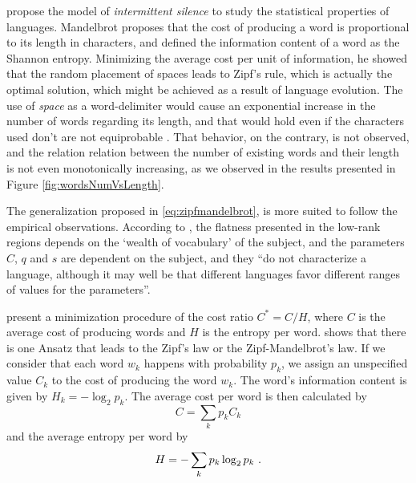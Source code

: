 \cite{miller1957,mandelbrot1965} propose the model of \textit{intermittent silence} to
study the statistical properties of languages. Mandelbrot proposes 
that the cost of producing a word is proportional to its length in characters,
and defined the information content of a word as the Shannon entropy.
Minimizing the average cost per unit of information, he showed that the
random placement of spaces leads to Zipf's rule, which is actually the optimal
solution, which might be achieved as a result of language evolution.
The use of \textit{space} as a word-delimiter 
would cause an exponential increase in the number of words regarding
its length, and that would hold even if the characters used don't
are not equiprobable \citep{li1992}. That behavior, on the contrary, is not
observed, and the relation relation between the number of existing words
and their length is not even monotonically increasing, as we observed 
in the results presented in Figure \ref{fig:wordsNumVsLength}.

The generalization proposed in \ref{eq:zipfmandelbrot}, is more suited to
follow the empirical observations. According to \cite{mandelbrot1965},
the flatness presented in the low-rank regions depends on the `wealth 
of vocabulary' of the subject, and the parameters $C$, $q$ and $s$
are dependent on the subject, and they ``do not characterize a language,
although it may well be that different languages favor different ranges
of values for the parameters''.

\cite{manin2009} present a minimization procedure of the cost ratio
$C^\ast = C/H$, where $C$ is the average cost of producing words 
and $H$ is the entropy per word. \cite{manin2009} shows that there is one
Ansatz that leads to the Zipf's law or the Zipf-Mandelbrot's law. 
If we consider that each word $w_k$ happens with probability $p_k$,
we assign an unspecified value $C_k$ to the cost of producing the word $w_k$.
The word's information content is given by $H_k = - \log_2 p_k$. 
The average cost per word is then calculated by
\begin{equation}
C = \sum_k p_k C_k
\end{equation}
and the average entropy per word by
\begin{equation}
H = - \sum_k p_k \log_2 p_k \textmd{ .}
\end{equation}

